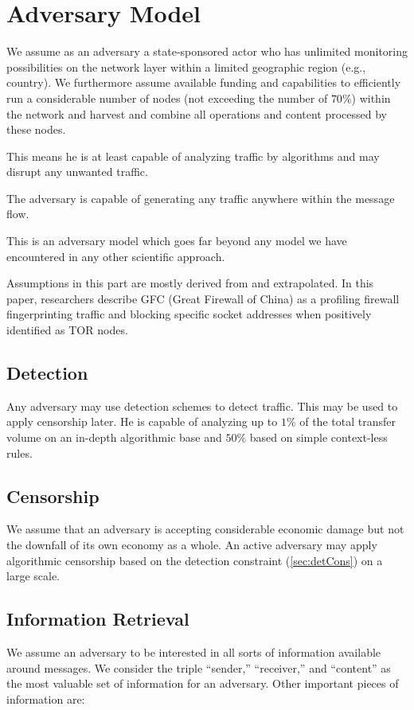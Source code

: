 \documentclass[runningheads]{llncs}
\begin{document}
\section{Adversary Model\label{sec:adversary}}
We assume as an adversary a state-sponsored actor who has unlimited monitoring possibilities on the network layer within a limited geographic region (e.g., country). We furthermore assume available funding and capabilities to efficiently run a considerable number of nodes (not exceeding the number of $70\%$) within the network and harvest and combine all operations and content processed by these nodes.

This means he is at least capable of analyzing traffic by algorithms and may disrupt any unwanted traffic.

The adversary is capable of generating any traffic anywhere within the message flow.

This is an adversary model which goes far beyond any model we have encountered in any other scientific approach.

Assumptions in this part are mostly derived from \cite{foci12-winter} and extrapolated. In this paper, researchers describe GFC (Great Firewall of China) as a profiling firewall fingerprinting traffic and blocking specific socket addresses when positively identified as TOR nodes. 

\subsection{Detection\label{sec:detCons}}
Any adversary may use detection schemes to detect traffic. This may be used to apply censorship later. He is capable of analyzing up to $1\%$ of the total transfer volume on an in-depth algorithmic base and $50\%$  based on simple context-less rules. 

\subsection{Censorship}
We assume that an adversary is accepting considerable economic damage but not the downfall of its own economy as a whole. An active adversary may apply algorithmic censorship based on the detection constraint (\ref{sec:detCons}) on a large scale.

\subsection{Information Retrieval}
We assume an adversary to be interested in all sorts of information available around messages. We consider the triple ``sender,'' ``receiver,'' and ``content'' as the most valuable set of information for an adversary. Other important pieces of information are:
\end{document}
